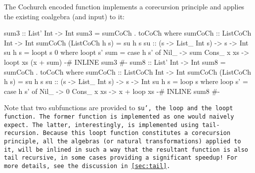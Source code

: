 The Cochurch encoded function implements a corecursion principle and applies the existing coalgebra (and input) to it:
\begin{code}
sum3 :: List' Int -> Int
sum3 = sumCoCh . toCoCh
  where sumCoCh :: ListCoCh Int -> Int
        sumCoCh (ListCoCh h s) = su h s
        su :: (s -> List_ Int s) -> s -> Int
        su h s = loopt s 0
          where loopt s' sum = case h s' of
                  Nil_ -> sum
                  Cons_ x xs -> loopt xs (x + sum)
{-# INLINE sum3 #-}
sum8 :: List' Int -> Int
sum8 = sumCoCh . toCoCh
  where sumCoCh :: ListCoCh Int -> Int
        sumCoCh (ListCoCh h s) = su h s
        su :: (s -> List_ Int s) -> s -> Int
        su h s = loop s
          where loop s' = case h s' of
                  Nil_ -> 0
                  Cons_ x xs -> x + loop xs
{-# INLINE sum8 #-}
\end{code}
Note that two subfunctions are provided to \tt{su'}, the \tt{loop} and the \tt{loopt} function.
The former function is implemented as one would naively expect.
The latter, interestingly, is implemented using tail-recursion.
Because this \tt{loopt} function constitutes a corecursion principle, all the algebras (or natural transformations) applied to it, will be inlined in such a way that the resultant function is also tail recursive, in some cases providing a significant speedup!
For more details, see the discussion in \autoref{sec:tail}.

